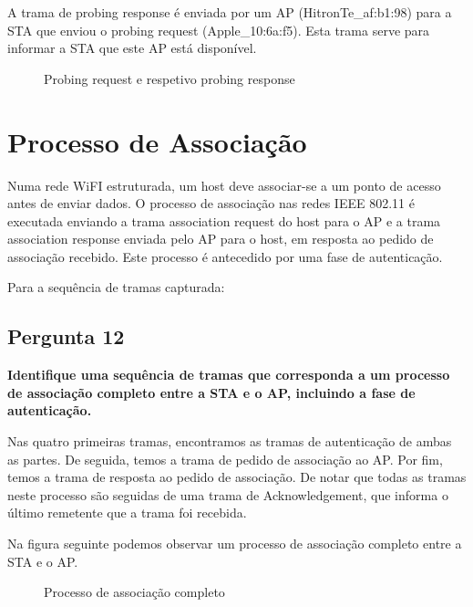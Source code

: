 \documentclass[11pt]{article}
\begin{document}
A trama de probing response é enviada por um AP (HitronTe\_af:b1:98) para a STA que enviou o probing request (Apple\_10:6a:f5). Esta trama serve para informar a STA que este AP está disponível.

\begin{figure}[hbt!]
    \centering
    \caption{Probing request e respetivo probing response}
\end{figure}


\clearpage
\section{Processo de Associação}

Numa rede WiFI estruturada, um host deve associar-se a um ponto de acesso antes de enviar dados. O processo de associação nas redes IEEE 802.11 é executada enviando a trama association request do host para o AP e a trama association response enviada pelo AP para o host, em resposta ao pedido de associação recebido. Este processo é antecedido por uma fase de autenticação.

Para a sequência de tramas capturada:

\vspace{0.5cm}

\subsection{Pergunta 12}

\textbf{Identifique uma sequência de tramas que corresponda a um processo de associação completo entre a STA e o AP, incluindo a fase de autenticação.}

Nas quatro primeiras tramas, encontramos as tramas de autenticação de ambas as partes. De seguida, temos a trama de pedido de associação ao AP. Por fim, temos a trama de resposta ao pedido de associação. De notar que todas as tramas neste processo são seguidas de uma trama de Acknowledgement, que informa o último remetente que a trama foi recebida.

Na figura seguinte podemos observar um processo de associação completo entre a STA e o AP.

\begin{figure}[hbt!]
    \centering
    \caption{Processo de associação completo}
\end{figure}
\end{document}
